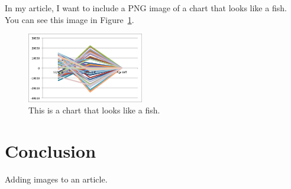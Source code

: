 \documentclass{proc}
\begin{document}
In my article, I want to include a PNG image of a chart that looks like a fish. You can see this image in Figure~\ref{fig:fish}.

\begin{figure}[htbp]
  \begin{center}
    \includegraphics[width=2in]{fish.png}
    \caption{This is a chart that looks like a fish.}
    \label{fig:fish}
  \end{center}
\end{figure}

\section{Conclusion}

Adding images to an article.
\end{document}
